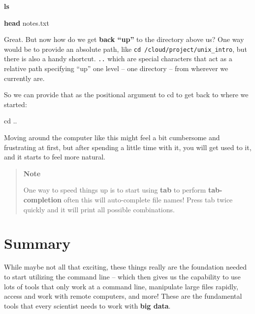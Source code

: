 \documentclass[
]{book}
\newenvironment{Shaded}{\begin{snugshade}}{\end{snugshade}}
\newcommand{\BuiltInTok}[1]{#1}
\newcommand{\FunctionTok}[1]{\textcolor[rgb]{0.13,0.29,0.53}{\textbf{#1}}}
\newcommand{\NormalTok}[1]{#1}
\begin{document}
\begin{Shaded}
\begin{Highlighting}[]
    \FunctionTok{ls}
\end{Highlighting}
\end{Shaded}

\begin{Shaded}
\begin{Highlighting}[]
    \FunctionTok{head}\NormalTok{ notes.txt}
\end{Highlighting}
\end{Shaded}

Great. But now how do we get \textbf{back ``up''} to the directory above us? One way would be to provide an absolute path, like \texttt{cd\ /cloud/project/unix\_intro}, but there is also a handy shortcut. \texttt{..} which are special characters that act as a relative path specifying ``up'' one level -- one directory -- from wherever we currently are.

So we can provide that as the positional argument to cd to get back to where we started:

\begin{Shaded}
\begin{Highlighting}[]
    \BuiltInTok{cd}\NormalTok{ ..}
\end{Highlighting}
\end{Shaded}

Moving around the computer like this might feel a bit cumbersome and frustrating at first, but after spending a little time with it, you will get used to it, and it starts to feel more natural.

\begin{quote}
\textbf{Note}

One way to speed things up is to start using \textbf{tab} to perform \textbf{tab-completion} often this will auto-complete file names! Press tab twice quickly and it will print all possible combinations.
\end{quote}

\hypertarget{summary}{%
\section{Summary}\label{summary}}

While maybe not all that exciting, these things really are the foundation needed to start utilizing the command line -- which then gives us the capability to use lots of tools that only work at a command line, manipulate large files rapidly, access and work with remote computers, and more! These are the fundamental tools that every scientist needs to work with \textbf{big data}.
\end{document}
